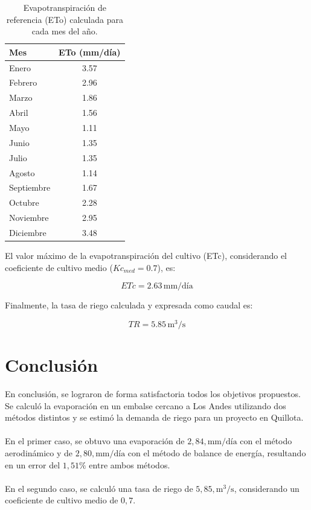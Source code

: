\documentclass{article}  %
\begin{document}
\begin{table}[H]
\centering
\begin{tabular}{|l|c|}
\hline
\textbf{Mes} & \textbf{ETo (mm/día)} \\ \hline
Enero        & 3.57                  \\ \hline
Febrero      & 2.96                  \\ \hline
Marzo        & 1.86                  \\ \hline
Abril        & 1.56                  \\ \hline
Mayo         & 1.11                  \\ \hline
Junio        & 1.35                  \\ \hline
Julio        & 1.35                  \\ \hline
Agosto       & 1.14                  \\ \hline
Septiembre   & 1.67                  \\ \hline
Octubre      & 2.28                  \\ \hline
Noviembre    & 2.95                  \\ \hline
Diciembre    & 3.48                  \\ \hline
\end{tabular}
\caption{Evapotranspiración de referencia (ETo) calculada para cada mes del año.}
\end{table}

El valor máximo de la evapotranspiración del cultivo (ETc), considerando el coeficiente de cultivo medio ($Kc_{med} = 0.7$), es:

\begin{equation}
ETc = 2.63 \, \text{mm/día}
\end{equation}

Finalmente, la tasa de riego calculada y expresada como caudal es:

\begin{equation}
TR = 5.85 \, \text{m}^3/\text{s}
\end{equation}

  
\section{Conclusión}

En conclusión, se lograron de forma satisfactoria todos los objetivos propuestos. Se calculó la evaporación en un embalse cercano a Los Andes utilizando dos métodos distintos y se estimó la demanda de riego para un proyecto en Quillota.
\\ \\
En el primer caso, se obtuvo una evaporación de $2,84 , \text{mm/día}$ con el método aerodinámico y de $2,80 , \text{mm/día}$ con el método de balance de energía, resultando en un error del $1,51 \%$ entre ambos métodos.
\\ \\
En el segundo caso, se calculó una tasa de riego de $5,85 , \text{m}^3/\text{s}$, considerando un coeficiente de cultivo medio de $0,7$.
\end{document}

